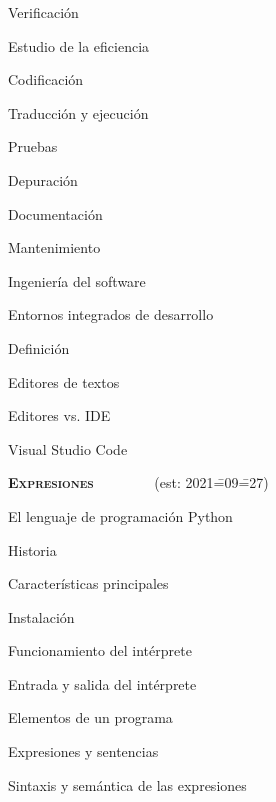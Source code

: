 \begin{longenum}
\begin{longenum}
\begin{longenum}
            \item Verificación
            \item Estudio de la eficiencia
            \item Codificación
            \item Traducción y ejecución
            \item Pruebas
            \item Depuración
            \item Documentación
            \item Mantenimiento
            \item Ingeniería del software
        \end{longenum}
        \item Entornos integrados de desarrollo
        \begin{longenum}
            \item Definición
            \item Editores de textos
            \item Editores vs. IDE
            \item Visual Studio Code
        \end{longenum}
    \end{longenum}
    \item \textbf{\textsc{Expresiones}} \ \ \ \ \ \ \ \ (est: 2021\==09\==27)
    \begin{longenum}
        \item El lenguaje de programación Python
        \begin{longenum}
            \item Historia
            \item Características principales
            \item Instalación
            \item Funcionamiento del intérprete
            \begin{longenum}
                \item Entrada y salida del intérprete
            \end{longenum}
        \end{longenum}
        \item Elementos de un programa
        \begin{longenum}
            \item Expresiones y sentencias
            \item Sintaxis y semántica de las expresiones

\end{longenum}
\end{longenum}
\end{longenum}
